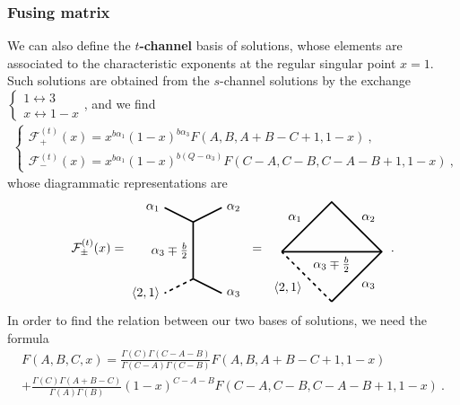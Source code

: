 \documentclass[12pt, a4paper, notitlepage, twoside]{report}
\numberwithin{equation}{section}
\theoremstyle{break}
\begin{document}
\subsubsection{Fusing matrix}

We can also define the \textbf{\boldmath $t$-channel} basis of solutions, whose elements are associated to the characteristic exponents at the regular singular point $x=1$.
Such solutions are obtained from the $s$-channel solutions by the exchange $\left\{\begin{smallmatrix} 1\leftrightarrow 3\\ x\leftrightarrow 1-x \end{smallmatrix}\right.$, and we find 
\begin{align}
 \left\{\begin{array}{l}  \mathcal{F}^{(t)}_+(x) = x^{b\alpha_1} (1-x)^{b\alpha_3} F(A,B,A+B-C+1,1-x) \ ,
\\ \mathcal{F}^{(t)}_-(x) =x^{b\alpha_1} (1-x)^{b(Q-\alpha_3)} F(C-A,C-B,C-A-B+1,1-x)\ ,
\end{array}\right.  
\end{align}
whose diagrammatic representations are 
\begin{align}
 \mathcal{F}^{(t)}_\pm(x)  =  
 \begin{tikzpicture}[baseline=(current  bounding  box.center), very thick, scale = .4]
 \draw (-2,3) node [left] {$\alpha_1$} -- (0,2) -- node [left] {$\alpha_3\mp \frac{b}{2}$} (0,-2);
 \draw[dashed] (0, -2) -- (-2, -3) node [left] {$\langle 2,1 \rangle$};
\draw (0,2) -- (2,3) node [right] {$\alpha_2$};
\draw (0,-2) -- (2, -3) node [right] {$\alpha_3$};
\end{tikzpicture}
\ =\
\begin{tikzpicture}[baseline=(current  bounding  box.center), very thick, scale = .7]
\draw (-2, 0) -- node [above left] {$\alpha_1$} (0, 2) -- node [above right] {$\alpha_2$} (2, 0) -- node [below right] {$\alpha_3$} (0, -2);
\draw[dashed] (0, -2) -- node [below left] {$\langle 2,1 \rangle$} (-2, 0);
\draw (-2, 0) -- node [below] {$\alpha_3\mp \frac{b}{2}$} (2, 0); 
\end{tikzpicture}
\ \ .
\label{tpic}
\end{align}
In order to find the relation between our two bases of solutions, we need the formula
\begin{multline}
 F(A,B,C,x) = \frac{\Gamma(C)\Gamma(C-A-B)}{\Gamma(C-A)\Gamma(C-B)} F(A,B,A+B-C+1,1-x) 
\\
 + \frac{\Gamma(C)\Gamma(A+B-C)}{\Gamma(A)\Gamma(B)} (1-x)^{C-A-B}F(C-A,C-B,C-A-B+1,1-x)\ .
\end{multline}
\end{document}
